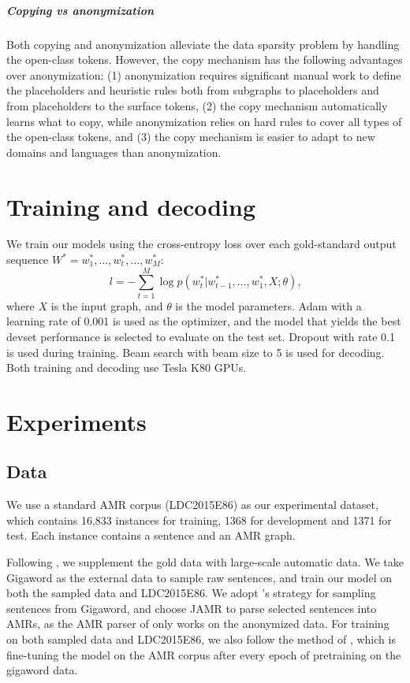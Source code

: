 \documentclass[11pt,a4paper]{article}
\begin{document}
\subparagraph{Copying vs anonymization}
Both copying and anonymization alleviate the data sparsity problem by handling the open-class tokens.
However, the copy mechanism has the following advantages over anonymization:
(1) anonymization requires significant manual work to define the placeholders and heuristic rules both from subgraphs to placeholders and from placeholders to the surface tokens, 
(2) the copy mechanism automatically learns what to copy, while anonymization relies on hard rules to cover all types of the open-class tokens, 
and (3) the copy mechanism is easier to adapt to new domains and languages than anonymization.

\section{Training and decoding}

We train our models using the cross-entropy loss over each gold-standard output sequence $W^*=w_1^*, \dots, w_t^*, \dots, w_M^*$:
\begin{equation}
l = -\sum_{t=1}^M \log p(w_t^*|w_{t-1}^*,\dots,w_1^*,X;\theta)\textrm{,}
\end{equation}
where $X$ is the input graph, and $\theta$ is the model parameters.
Adam \cite{kingma2014adam} with a learning rate of 0.001 is used as the optimizer, and the model that yields the best devset performance is selected to evaluate on the test set.
Dropout with rate 0.1 is used during training.
Beam search with beam size to 5 is used for decoding.
Both training and decoding use Tesla K80 GPUs.


\section{Experiments}

\subsection{Data}

We use a standard AMR corpus (LDC2015E86) as our experimental dataset, which contains 16,833 instances for training, 1368 for development and 1371 for test. Each instance contains a sentence and an AMR graph.


Following , we supplement the gold data with large-scale automatic data.
We take Gigaword as the external data to sample raw sentences, and train our model on both the sampled data and LDC2015E86.
We adopt 's strategy for sampling sentences from Gigaword, and choose JAMR \cite{flanigan-EtAl:2016:SemEval} to parse selected sentences into AMRs, as the AMR parser of  only works on the anonymized data.
For training on both sampled data and LDC2015E86, we also follow the method of , which is fine-tuning the model on the AMR corpus after every epoch of pretraining on the gigaword data.
\end{document}
